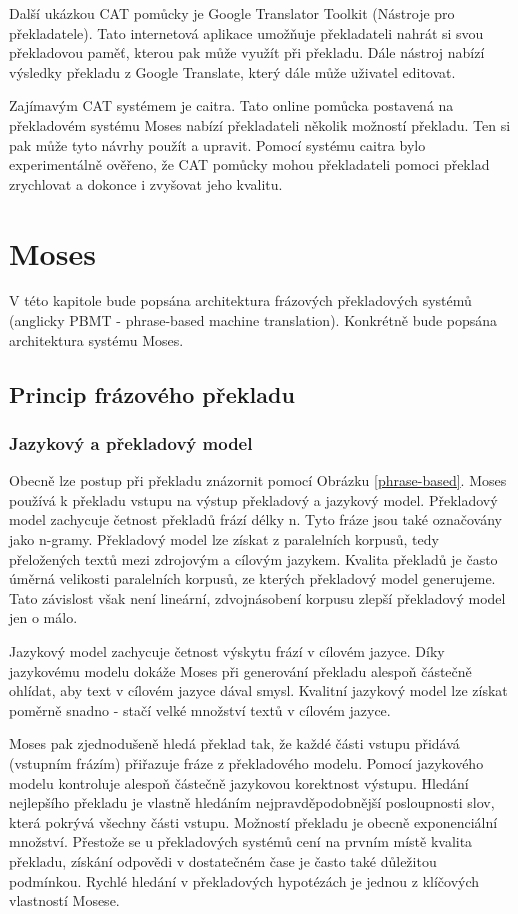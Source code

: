 \documentclass[12pt,a4paper]{report}
\begin{document}
Další ukázkou CAT pomůcky je Google Translator Toolkit (Nástroje pro překladatele). Tato internetová aplikace umožňuje překladateli nahrát si svou překladovou paměť, kterou pak může využít při překladu. Dále nástroj nabízí výsledky překladu z Google Translate, který dále může uživatel editovat.

Zajímavým CAT systémem je caitra. Tato online pomůcka postavená na překladovém systému Moses nabízí překladateli několik možností překladu. Ten si pak může tyto návrhy použít a upravit. Pomocí systému caitra bylo experimentálně ověřeno, že CAT pomůcky mohou překladateli pomoci překlad zrychlovat a dokonce i zvyšovat jeho kvalitu.

\chapter{Moses}

V této kapitole bude popsána architektura frázových překladových systémů (anglicky PBMT - phrase-based machine translation). Konkrétně bude popsána architektura systému Moses.

\section{Princip frázového překladu}

\subsection{Jazykový a překladový model}
Obecně lze postup při překladu znázornit pomocí Obrázku \ref{phrase-based}. Moses používá k překladu vstupu na výstup překladový a jazykový model. Překladový model zachycuje četnost překladů frází délky n. Tyto fráze jsou také označovány jako n-gramy. Překladový model lze získat z paralelních korpusů, tedy přeložených textů mezi zdrojovým a cílovým jazykem. Kvalita překladů je často úměrná velikosti paralelních korpusů, ze kterých překladový model generujeme. Tato závislost však není lineární, zdvojnásobení korpusu zlepší překladový model jen o málo.

Jazykový model zachycuje četnost výskytu frází v cílovém jazyce. Díky jazykovému modelu dokáže Moses při generování překladu alespoň částečně ohlídat, aby text v cílovém jazyce dával smysl. Kvalitní jazykový model lze získat poměrně snadno - stačí velké množství textů v cílovém jazyce.

Moses pak zjednodušeně hledá překlad tak, že každé části vstupu přidává (vstupním frázím) přiřazuje fráze z překladového modelu. Pomocí jazykového modelu kontroluje alespoň částečně jazykovou korektnost výstupu. Hledání nejlepšího překladu je vlastně hledáním nejpravděpodobnější posloupnosti slov, která pokrývá všechny části vstupu. Možností překladu je obecně exponenciální množství. Přestože se u překladových systémů cení na prvním místě kvalita překladu, získání odpovědi v dostatečném čase je často také důležitou podmínkou. Rychlé hledání v překladových hypotézách je jednou z klíčových vlastností Mosese.
\end{document}
